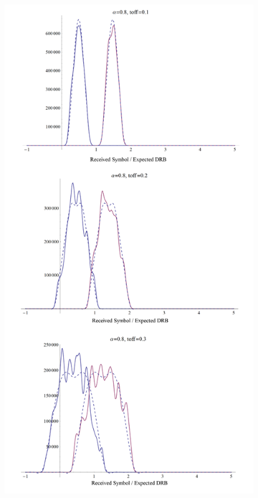 \begin{figure}[htbp]
\centering
\includegraphics[height=\textheight]{comparison_full.png}
\end{figure}

